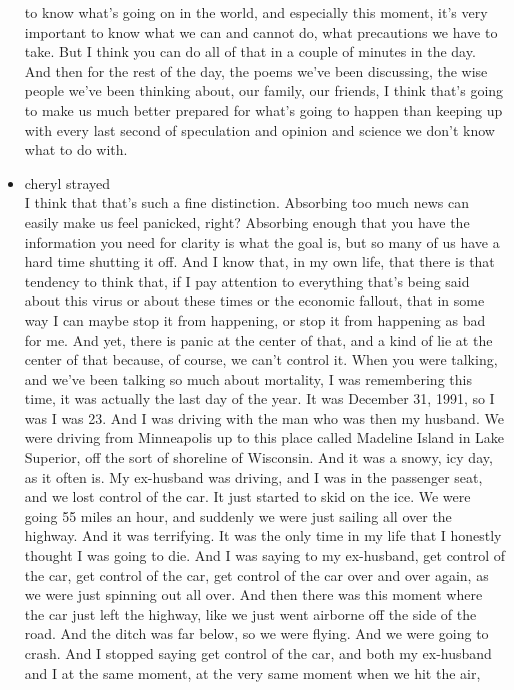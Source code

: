 \begin{itemize}
  to know what's going on in the world, and especially this moment, it's
  very important to know what we can and cannot do, what precautions we
  have to take. But I think you can do all of that in a couple of
  minutes in the day. And then for the rest of the day, the poems we've
  been discussing, the wise people we've been thinking about, our
  family, our friends, I think that's going to make us much better
  prepared for what's going to happen than keeping up with every last
  second of speculation and opinion and science we don't know what to do
  with.
\item
  cheryl strayed\\
  I think that that's such a fine distinction. Absorbing too much news
  can easily make us feel panicked, right? Absorbing enough that you
  have the information you need for clarity is what the goal is, but so
  many of us have a hard time shutting it off. And I know that, in my
  own life, that there is that tendency to think that, if I pay
  attention to everything that's being said about this virus or about
  these times or the economic fallout, that in some way I can maybe stop
  it from happening, or stop it from happening as bad for me. And yet,
  there is panic at the center of that, and a kind of lie at the center
  of that because, of course, we can't control it. When you were
  talking, and we've been talking so much about mortality, I was
  remembering this time, it was actually the last day of the year. It
  was December 31, 1991, so I was I was 23. And I was driving with the
  man who was then my husband. We were driving from Minneapolis up to
  this place called Madeline Island in Lake Superior, off the sort of
  shoreline of Wisconsin. And it was a snowy, icy day, as it often is.
  My ex-husband was driving, and I was in the passenger seat, and we
  lost control of the car. It just started to skid on the ice. We were
  going 55 miles an hour, and suddenly we were just sailing all over the
  highway. And it was terrifying. It was the only time in my life that I
  honestly thought I was going to die. And I was saying to my
  ex-husband, get control of the car, get control of the car, get
  control of the car over and over again, as we were just spinning out
  all over. And then there was this moment where the car just left the
  highway, like we just went airborne off the side of the road. And the
  ditch was far below, so we were flying. And we were going to crash.
  And I stopped saying get control of the car, and both my ex-husband
  and I at the same moment, at the very same moment when we hit the air,

\end{itemize}
